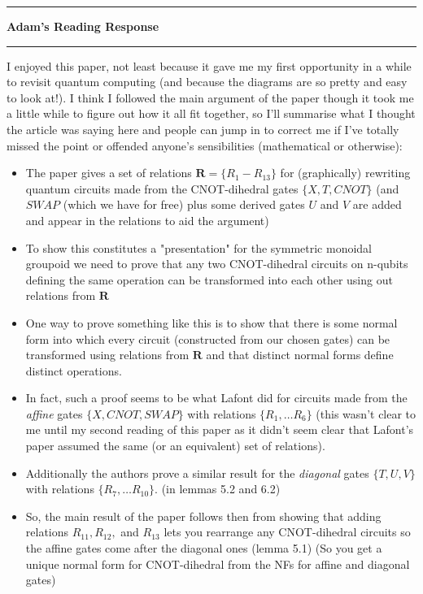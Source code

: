 \documentclass{amsart}
\newcommand{\iam}[1]{
  \vspace{0.25em}
  \hrule
  \vspace{0.25em}
  \textbf{{#1}'s Reading Response}
  \vspace{0.25em}
  \hrule
  \vspace{1em}
}
\begin{document}
\iam{Adam}
I enjoyed this paper, not least because it gave me my first opportunity in a while to revisit quantum computing  (and because the diagrams are so pretty and easy to look at!). I think I followed the main argument of the paper though it took me a little while to figure out how it all fit together, so I'll summarise what I thought the article was saying here and people can jump in to correct me if I've totally missed the point or offended anyone's sensibilities (mathematical or otherwise):
\begin{itemize}
  \item The paper gives a set of relations $\mathbf{R} = \{R_1-R_13\}$ for (graphically) rewriting quantum circuits made from the CNOT-dihedral gates $\{X, T, CNOT \}$ (and $SWAP$ (which we have for free) plus some derived gates $U$ and $V$ are added and appear in the relations to aid the argument)
  \item To show this constitutes a "presentation" for the symmetric monoidal groupoid we need to prove that any two CNOT-dihedral circuits on n-qubits defining the same operation can be transformed into each other using out relations from $\mathbf{R}$
  \item One way to prove something like this is to show that there is some normal form into which every circuit (constructed from our chosen gates) can be transformed using relations from $\mathbf{R}$ and that distinct normal forms define distinct operations.
  \item In fact, such a proof seems to be what Lafont \cite{LafontBooleanCircuits} did for circuits made from the \textit{affine} gates $\{X, CNOT, SWAP\}$ with relations $\{R_1, \dots R_6 \}$ (this wasn't clear to me until my second reading of this paper as it didn't seem clear that Lafont's paper assumed the same (or an equivalent) set of relations).
  \item Additionally the authors prove a similar result for the \textit{diagonal} gates $\{T, U, V \}$  with relations $\{R_7, \dots R_10\}$. (in lemmas 5.2 and 6.2)
  \item So, the main result of the paper follows then from showing that adding relations $R_11, R_12,$ and $R_13$ lets you rearrange any CNOT-dihedral circuits so the affine gates come after the diagonal ones (lemma 5.1) (So you get a unique normal form for CNOT-dihedral from the NFs for affine and diagonal gates)

\end{itemize}
\end{document}
